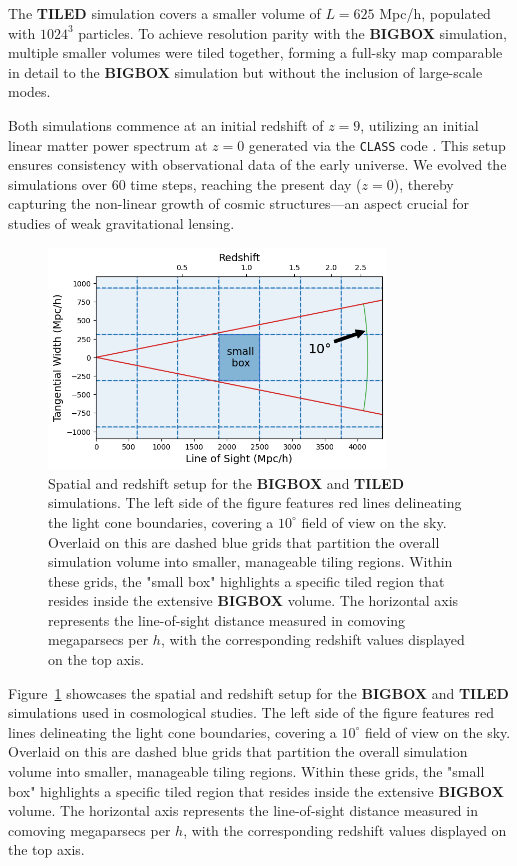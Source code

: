 The \textbf{TILED} simulation covers a smaller volume of $L = 625$ Mpc/h, populated with $1024^3$ particles. To achieve resolution parity with the \textbf{BIGBOX} simulation, multiple smaller volumes were tiled together, forming a full-sky map comparable in detail to the \textbf{BIGBOX} simulation but without the inclusion of large-scale modes.

Both simulations commence at an initial redshift of $z = 9$, utilizing an initial linear matter power spectrum at $z = 0$ generated via the \texttt{CLASS} code \citep{2011JCAP...07..034B}. This setup ensures consistency with observational data of the early universe. We evolved the simulations over 60 time steps, reaching the present day ($z = 0$), thereby capturing the non-linear growth of cosmic structures—an aspect crucial for studies of weak gravitational lensing.

\begin{figure}[ht]
    \centering
    \includegraphics[width=0.8\textwidth]{figures/light_cone_configuration.png}
    \caption{Spatial and redshift setup for the \textbf{BIGBOX} and \textbf{TILED} simulations. The left side of the figure features red lines delineating the light cone boundaries, covering a $10^\circ$ field of view on the sky. Overlaid on this are dashed blue grids that partition the overall simulation volume into smaller, manageable tiling regions. Within these grids, the "small box" highlights a specific tiled region that resides inside the extensive \textbf{BIGBOX} volume. The horizontal axis represents the line-of-sight distance measured in comoving megaparsecs per $h$, with the corresponding redshift values displayed on the top axis.} \label{fig:simulationsetting}
\end{figure}
Figure~\ref{fig:simulationsetting} showcases the spatial and redshift setup for the \textbf{BIGBOX} and \textbf{TILED} simulations used in cosmological studies. The left side of the figure features red lines delineating the light cone boundaries, covering a $10^\circ$ field of view on the sky. Overlaid on this are dashed blue grids that partition the overall simulation volume into smaller, manageable tiling regions. Within these grids, the "small box" highlights a specific tiled region that resides inside the extensive \textbf{BIGBOX} volume. The horizontal axis represents the line-of-sight distance measured in comoving megaparsecs per $h$, with the corresponding redshift values displayed on the top axis. 

